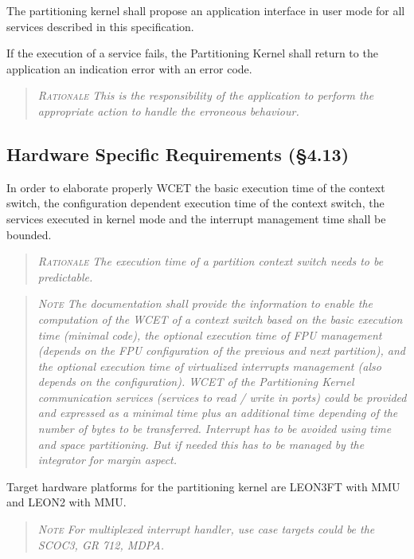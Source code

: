 The partitioning kernel shall propose an application interface in user mode for all services described in this specification.

If the execution of a service fails, the Partitioning Kernel shall return to the application an indication error with an error code.
\begin{quote}\it
\textsc{Rationale}
This is the responsibility of the application to perform the appropriate action to handle the erroneous behaviour.
\end{quote}

\subsection{Hardware Specific Requirements (\S4.13)}

In order to elaborate properly WCET the basic execution time of the context switch, the configuration dependent execution time of the context switch, the services executed in kernel mode and the interrupt management time shall be bounded.
\begin{quote}\it
\textsc{Rationale}
The execution time of a partition context switch needs to be predictable.
\end{quote}
\begin{quote}\it
\textsc{Note}
The documentation shall provide the information to enable the computation of the WCET of a context switch based on the basic execution time (minimal code), the optional execution time of FPU management (depends on the FPU configuration of the previous and next partition), and the optional execution time of virtualized interrupts management (also depends on the configuration). WCET of the Partitioning Kernel communication services (services to read / write in ports) could be provided and expressed as a minimal time plus an additional time depending of the number of bytes to be transferred.
Interrupt has to be avoided using time and space partitioning. But if needed this has to be managed by the integrator for margin aspect.
\end{quote}

Target hardware platforms for the partitioning kernel are LEON3FT with MMU and LEON2 with MMU.
\begin{quote}\it
\textsc{Note}
For multiplexed interrupt handler, use case targets could  be the SCOC3, GR 712, MDPA.
\end{quote}

